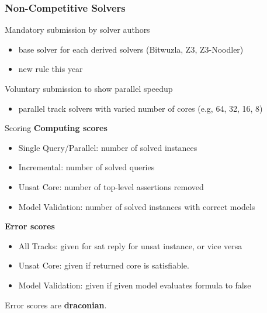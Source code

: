 \documentclass[table]{beamer}
\def\emph#1{\textcolor{MYblue}{#1}}
\begin{document}
\begin{frame}
  \frametitle{Non-Competitive Solvers}

  Mandatory submission by solver authors
  \begin{itemize}
  \item base solver for each \emph{derived} solvers (Bitwuzla, Z3, Z3-Noodler)
  \item new rule this year
  \end{itemize}

  \bigskip

  Voluntary submission to show parallel speedup
  \begin{itemize}
  \item parallel track solvers with varied number of cores (e.g, 64, 32, 16, 8)
  \end{itemize}

  \bigskip

\end{frame}

\begin{frame}{Scoring}
  \textbf{Computing scores}
  \begin{itemize}
  \item \emph{Single Query/Parallel}: number of solved \emph{instances}
  \item \emph{Incremental}: number of solved \emph{queries}
  \item \emph{Unsat Core}: number of top-level assertions \emph{removed}
  \item \emph{Model Validation}: number of solved instances with correct \emph{models}
  \end{itemize}

  \bigskip

  \textbf{Error scores}
  \begin{itemize}
  \item \emph{All Tracks}: given for sat reply for unsat instance, or vice versa
  \item \emph{Unsat Core}: given if returned core is satisfiable.
  \item \emph{Model Validation}: given if given model evaluates formula to \emph{false}
  \end{itemize}

  \bigskip
  Error scores are \textbf{draconian}.
\end{frame}
\end{document}
